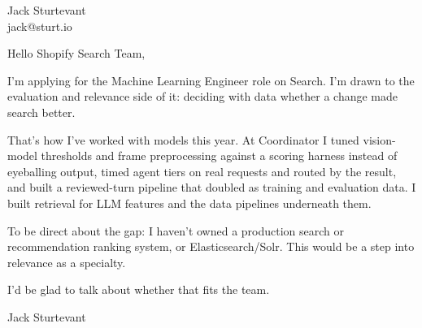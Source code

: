 \documentclass[11pt]{article}
\begin{document}
\raggedright

{\namefont\fontsize{20pt}{24pt}\selectfont Jack Sturtevant}\\[-0.3em]
jack@sturt.io

\vspace{1.2em}

Hello Shopify Search Team,

I'm applying for the Machine Learning Engineer role on Search. I'm drawn to the evaluation and relevance side of it: deciding with data whether a change made search better.

That's how I've worked with models this year. At Coordinator I tuned vision-model thresholds and frame preprocessing against a scoring harness instead of eyeballing output, timed agent tiers on real requests and routed by the result, and built a reviewed-turn pipeline that doubled as training and evaluation data. I built retrieval for LLM features and the data pipelines underneath them.

To be direct about the gap: I haven't owned a production search or recommendation ranking system, or Elasticsearch/Solr. This would be a step into relevance as a specialty.

I'd be glad to talk about whether that fits the team.

\vspace{0.6em}
Jack Sturtevant
\end{document}
